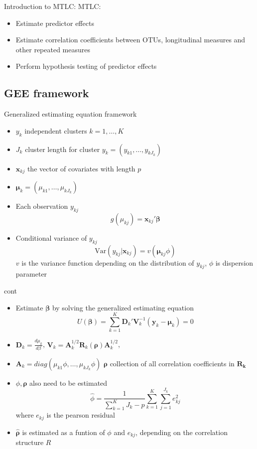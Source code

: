 \documentclass{beamer}
\begin{document}
\begin{frame}[t]{Introduction to MTLC:}
  MTLC:
  \begin{itemize}
    \item Estimate predictor effects
    \item Estimate correlation coefficients between OTUs, longitudinal measures and other repeated measures
    \item Perform hypothesis testing of predictor effects
  \end{itemize}
\end{frame}

\subsection{GEE framework}

\begin{frame}[t]{Generalized estimating equation framework}
  \begin{itemize}
    \item $y_k$ independent clusters $k = 1, \ldots , K$
    \item $J_k$ cluster length for cluster $y_k = (y_{k1}, \ldots , y_{kJ_k})$
    \item $\mathbf{x}_{kj}$ the vector of covariates with length $p$
    \item $\boldsymbol\mu_k = (\mu_{k1}, \ldots , \mu_{kJ_k})$
    \item Each observation $y_{kj}$
    $$g(\mu_{kj}) = \mathbf{x}_{kj}'\boldsymbol\beta$$
    \item Conditional variance of $y_{kj}$
    $$\text{Var}(y_{kj}|\boldsymbol{x}_{kj}) = v(\boldsymbol \mu_{kj}\phi)$$
    $v$ is the variance function depending on the distribution of $y_{kj}$, $\phi$ is dispersion parameter
  \end{itemize}
\end{frame}


\begin{frame}[t]{cont}
  \begin{itemize}
    \item Estimate $\boldsymbol\beta$ by solving the generalized estimating equation
    $$U(\boldsymbol\beta) = \sum_{k = 1}^K \boldsymbol{D}_k'\boldsymbol{V}_{k}^{-1}(\boldsymbol{y}_k - \boldsymbol{\mu}_k) = 0$$
    \item $\boldsymbol{D}_k = \frac{d\mu_k}{d\beta}$, $\boldsymbol{V}_k = \boldsymbol{A}_k^{1/2}\boldsymbol{R}_k(\boldsymbol\rho)\boldsymbol{A}_k^{1/2}$,
    \item  $\boldsymbol{A}_k = diag(\mu_{k1}\phi, \ldots , \mu_{kJ_k}\phi)$ $\boldsymbol\rho$ collection of all correlation coefficients in $\boldsymbol{R_k}$
    \item $\phi, \boldsymbol\rho$ also need to be estimated
    $$\hat\phi = \frac{1}{\sum_{k=1}^K J_k - p}\sum_{k=1}^K\sum_{j=1}^{J_k} e^2_{kj}$$
    where $e_{kj}$ is the pearson residual
    \item $\hat{\boldsymbol\rho}$ is estimated as a funtion of $\phi$ and $e_{kj}$, depending on the correlation structure $R $
  \end{itemize}
\end{frame}
\end{document}
